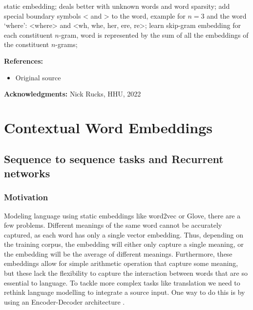 \documentclass[11pt, a4paper]{amsart}
\begin{document}
{
\color{blue}

static embedding;
deals better with unknown words and word sparsity;
add special boundary symbols < and > to the word,
example for $n=3$ and the word `where':
<where> and <wh, whe, her, ere, re>;
learn skip-gram embedding for each constituent $n$-gram, word is represented by the sum of all the embeddings of the constituent $n$-grams;
} %

\noindent \textbf{References:}
\begin{itemize}
	\item Original source \cite{DBLP:journals/corr/BojanowskiGJM16}
\end{itemize}

{
\color{gray}

\noindent \textbf{Acknowledgments:} Nick Rucks, HHU, 2022
}

\section{Contextual Word Embeddings}
\label{sec:contextual_word_embeddings}

\subsection{Sequence to sequence tasks and Recurrent networks}


\subsubsection{Motivation}

Modeling language using static embeddings like word2vec or Glove, there are a few problems. Different meanings of the same word cannot be accurately captured, as each word has only a single vector embedding. Thus, depending on the training corpus, the embedding will either only capture a single meaning, or the embedding will be the average of different meanings. Furthermore, these embeddings allow for simple arithmetic operation that capture some meaning, but these lack the flexibility to capture the interaction between words that are so essential to language. To tackle more complex tasks like translation we need to rethink language modelling to integrate a source input. One way to do this is by using an Encoder-Decoder architecture \cite{voitseq2seq}. 
\end{document}
